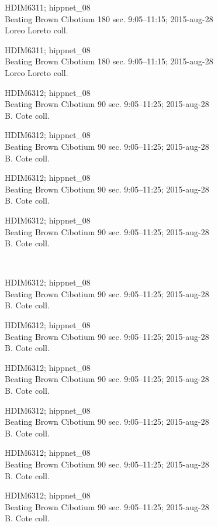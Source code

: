 \documentclass[2pt]{extarticle}
\begin{document}
\noindent
\parbox{0.16\textwidth}{\tiny \raggedright \rule[-0.3\baselineskip]{0pt}{10pt}HDIM6311; hippnet\_08\\ Beating Brown Cibotium 180 sec. 9:05--11:15; 2015-aug-28\\ Loreo Loreto coll.}
\parbox{0.16\textwidth}{\tiny \raggedright \rule[-0.3\baselineskip]{0pt}{10pt}HDIM6311; hippnet\_08\\ Beating Brown Cibotium 180 sec. 9:05--11:15; 2015-aug-28\\ Loreo Loreto coll.}
\parbox{0.16\textwidth}{\tiny \raggedright \rule[-0.3\baselineskip]{0pt}{10pt}HDIM6312; hippnet\_08\\ Beating Brown Cibotium 90 sec. 9:05--11:25; 2015-aug-28\\ B. Cote coll.}
\parbox{0.16\textwidth}{\tiny \raggedright \rule[-0.3\baselineskip]{0pt}{10pt}HDIM6312; hippnet\_08\\ Beating Brown Cibotium 90 sec. 9:05--11:25; 2015-aug-28\\ B. Cote coll.}
\parbox{0.16\textwidth}{\tiny \raggedright \rule[-0.3\baselineskip]{0pt}{10pt}HDIM6312; hippnet\_08\\ Beating Brown Cibotium 90 sec. 9:05--11:25; 2015-aug-28\\ B. Cote coll.}
\parbox{0.16\textwidth}{\tiny \raggedright \rule[-0.3\baselineskip]{0pt}{10pt}HDIM6312; hippnet\_08\\ Beating Brown Cibotium 90 sec. 9:05--11:25; 2015-aug-28\\ B. Cote coll.} \\ 
\vspace{0.001in} 

\noindent
\parbox{0.16\textwidth}{\tiny \raggedright \rule[-0.3\baselineskip]{0pt}{10pt}HDIM6312; hippnet\_08\\ Beating Brown Cibotium 90 sec. 9:05--11:25; 2015-aug-28\\ B. Cote coll.}
\parbox{0.16\textwidth}{\tiny \raggedright \rule[-0.3\baselineskip]{0pt}{10pt}HDIM6312; hippnet\_08\\ Beating Brown Cibotium 90 sec. 9:05--11:25; 2015-aug-28\\ B. Cote coll.}
\parbox{0.16\textwidth}{\tiny \raggedright \rule[-0.3\baselineskip]{0pt}{10pt}HDIM6312; hippnet\_08\\ Beating Brown Cibotium 90 sec. 9:05--11:25; 2015-aug-28\\ B. Cote coll.}
\parbox{0.16\textwidth}{\tiny \raggedright \rule[-0.3\baselineskip]{0pt}{10pt}HDIM6312; hippnet\_08\\ Beating Brown Cibotium 90 sec. 9:05--11:25; 2015-aug-28\\ B. Cote coll.}
\parbox{0.16\textwidth}{\tiny \raggedright \rule[-0.3\baselineskip]{0pt}{10pt}HDIM6312; hippnet\_08\\ Beating Brown Cibotium 90 sec. 9:05--11:25; 2015-aug-28\\ B. Cote coll.}
\parbox{0.16\textwidth}{\tiny \raggedright \rule[-0.3\baselineskip]{0pt}{10pt}HDIM6312; hippnet\_08\\ Beating Brown Cibotium 90 sec. 9:05--11:25; 2015-aug-28\\ B. Cote coll.} \\ 
\vspace{0.001in} 
\end{document}
